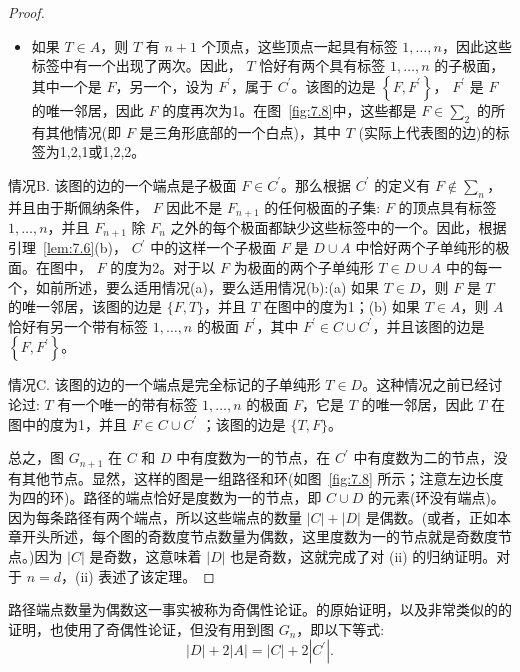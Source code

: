 \begin{proof}
\begin{itemize}
    \item [(b)] 如果 \(T \in  A\)，则 \(T\) 有 \(n + 1\) 个顶点，这些顶点一起具有标签 \(1,\ldots,n\)，因此这些标签中有一个出现了两次。因此， \(T\) 恰好有两个具有标签 \(1,\ldots,n\) 的子极面，其中一个是 \(F\)，另一个，设为 \({F}^{\prime }\)，属于 \({C}^{\prime }\)。该图的边是 \(\left\{  {F,{F}^{\prime }}\right\}\)， \({F}^{\prime }\) 是 \(F\) 的唯一邻居，因此 \(F\) 的度再次为1。在图~\ref{fig:7.8}中，这些都是 \(F \in  {\sum }_{2}\) 的所有其他情况(即 \(F\) 是三角形底部的一个白点)，其中 \(T\) (实际上代表图的边)的标签为1,2,1或1,2,2。
\end{itemize}

情况B. 该图的边的一个端点是子极面 \(F \in  {C}^{\prime }\)。那么根据 \({C}^{\prime }\) 的定义有 \(F \notin  {\sum }_{n}\)，并且由于斯佩纳条件， \(F\) 因此不是 \({F}_{n + 1}\) 的任何极面的子集: \(F\) 的顶点具有标签 \(1,\ldots,n\)，并且 \({F}_{n + 1}\) 除 \({F}_{n}\) 之外的每个极面都缺少这些标签中的一个。因此，根据引理~\ref{lem:7.6}(b)， \({C}^{\prime }\) 中的这样一个子极面 \(F\) 是 \(D \cup  A\) 中恰好两个子单纯形的极面。在图中， \(F\) 的度为2。对于以 \(F\) 为极面的两个子单纯形 \(T \in  D \cup  A\) 中的每一个，如前所述，要么适用情况(a)，要么适用情况(b):(a) 如果 \(T \in  D\)，则 \(F\) 是 \(T\) 的唯一邻居，该图的边是 \(\{ F,T\}\)，并且 \(T\) 在图中的度为1；(b) 如果 \(T \in  A\)，则 \(A\) 恰好有另一个带有标签 \(1,\ldots,n\) 的极面 \({F}^{\prime }\)，其中 \({F}^{\prime } \in  C \cup  {C}^{\prime }\)，并且该图的边是 \(\left\{  {F,{F}^{\prime }}\right\}\)。

情况C. 该图的边的一个端点是完全标记的子单纯形 \(T \in  D\)。这种情况之前已经讨论过: \(T\) 有一个唯一的带有标签 \(1,\ldots,n\) 的极面 \(F\)，它是 \(T\) 的唯一邻居，因此 \(T\) 在图中的度为1，并且 \(F \in  C \cup  {C}^{\prime }\) ；该图的边是 \(\{ T,F\}\)。

总之，图 \({G}_{n + 1}\) 在 \(C\) 和 \(D\) 中有度数为一的节点，在 \({C}^{\prime }\) 中有度数为二的节点，没有其他节点。显然，这样的图是一组路径和环(如图~\ref{fig:7.8} 所示；注意左边长度为四的环)。路径的端点恰好是度数为一的节点，即 \(C \cup  D\) 的元素(环没有端点)。因为每条路径有两个端点，所以这些端点的数量 \(\left| C\right|  + \left| D\right|\) 是偶数。(或者，正如本章开头所述，每个图的奇数度节点数量为偶数，这里度数为一的节点就是奇数度节点。)因为 \(\left| C\right|\) 是奇数，这意味着 \(\left| D\right|\) 也是奇数，这就完成了对 (ii) 的归纳证明。对于 \(n = d\)，(ii) 表述了该定理。
\end{proof}

路径端点数量为偶数这一事实被称为奇偶性论证。\citet{sperner1928}的原始证明，以及非常类似的\citet*{knaster1929}的证明，也使用了奇偶性论证，但没有用到图 \({G}_{n}\)，即以下等式:
\begin{equation}
\left| D\right|  + 2\left| A\right|  = \left| C\right|  + 2\left| {C}^{\prime }\right| .\label{eq:7.12}
\end{equation}

